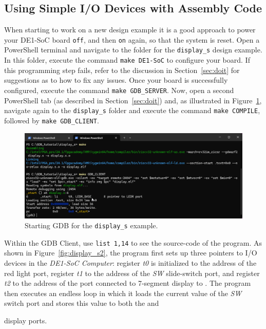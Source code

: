 \documentclass[11pt, twoside, pdftex]{article}
\newcommand{\red}[1]{{\color{red}\sf{#1}}}
\begin{document}
{\subsection{Using Simple I/O Devices with Assembly Code}
\label{sec:simpleIO}

When starting to work on a new design example it is a good approach to power your DE1-SoC
board \texttt{off}, and then \texttt{on} again, so that the system is reset.   
Open a PowerShell terminal and navigate to the folder for the \texttt{display\_s} design
example. In this folder, execute the command \texttt{make DE1-SoC} to configure your board. 
If this programming step fails, refer to the discussion in Section~\ref{sec:doit} for
suggestions as to how to fix any issues. Once your board is successfully configured,
execute the command \texttt{make GDB\_SERVER}. Now, open a second
PowerShell tab (as described in Section~\ref{sec:doit}) and, as illustrated in 
Figure~\ref{fig:display_s1}, navigate again to the \texttt{display\_s} folder and 
execute the command \texttt{make COMPILE}, followed by \texttt{make GDB\_CLIENT}.

\begin{figure}[h]
    \begin{center}
        \includegraphics[scale=.6]{figures/display_s1.png}
        \caption{Starting GDB for the \texttt{display\_s} example.}
        \label{fig:display_s1}
    \end{center}
\end{figure}

Within the GDB Client, use \texttt{list 1,14} to see the source-code of the program. As
shown in  Figure~\ref{fig:display_s2}, the program first sets up three pointers to I/O
devices in the {\it DE1-SoC Computer}: register {\it t0} is initialized to the address of 
the \red{{\it LEDR}} red light port, register {\it t1} to the address of the {\it SW} slide-switch
port, and register {\it t2} to the address of the port connected to 7-segment display 
\red{{\it HEX3}} to \red{{\it HEX0}}. The program then executes an endless loop in 
which it loads the current value of the {\it SW} switch port and stores this value to 
both the \red{{\it LEDR}} and \red{\it HEX0}} display ports. 
\end{document}
